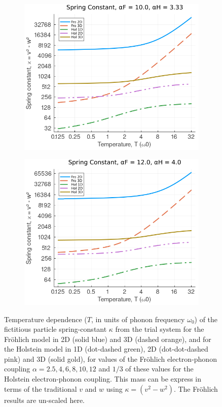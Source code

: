 \begin{figure}[!tbp]
\begin{subfigure}[b]{0.49\textwidth}
    \includegraphics[width=\textwidth]{figures/spring_temp_10_333.png}
  \end{subfigure}
  \hfill
  \begin{subfigure}[b]{0.49\textwidth}
    \includegraphics[width=\textwidth]{figures/spring_temp_12_4.png}
  \end{subfigure}
  \caption{Temperature dependence ($T$, in units of phonon frequency $\omega_0$) of the fictitious particle spring-constant $\kappa$ from the trial system for the Fr\"ohlich model in 2D (solid blue) and 3D (dashed orange), and for the Holstein model in 1D (dot-dashed green), 2D (dot-dot-dashed pink) and 3D (solid gold), for values of the Fr\"ohlich electron-phonon coupling $\alpha = 2.5, 4, 6, 8, 10, 12$ and $1/3$ of these values for the Holstein electron-phonon coupling. This mass can be express in terms of the traditional $v$ and $w$ using $\kappa = (v^2 - w^2)$. The Fr\"ohlich results are un-scaled here.}
  \label{fig:spring_temp}
\end{figure}

